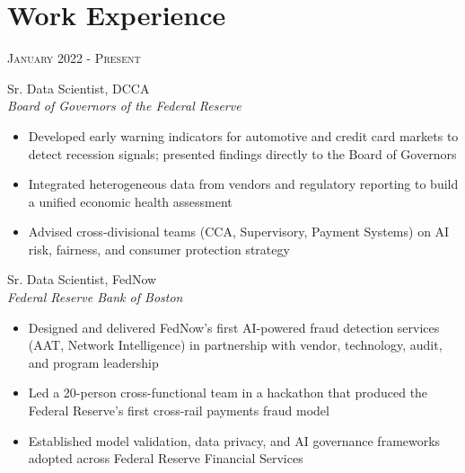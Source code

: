 \documentclass[9pt]{article} %
\begin{document}
\begin{minipage}[t]{0.55\textwidth} %
\vspace{0pt} %
	

\section{Work Experience} 

{\raggedleft\textsc{January 2022 - Present}\par}

{\raggedright\large Sr. Data Scientist,  DCCA\\ 
\textit{Board of Governors of the Federal Reserve}\\[1pt]}

\normalsize{
\begin{itemize}
\item Developed early warning indicators for automotive and credit card markets to detect recession signals; presented findings directly to the Board of Governors
\item Integrated heterogeneous data from vendors and regulatory reporting to build a unified economic health assessment
\item Advised cross-divisional teams (CCA, Supervisory, Payment Systems) on AI risk, fairness, and consumer protection strategy
\end{itemize}}

{\raggedright\large Sr. Data Scientist,  FedNow\\ 
\textit{Federal Reserve Bank of Boston}\\[1pt]}

\normalsize{
\begin{itemize}
\item Designed and delivered FedNow's first AI-powered fraud detection services (AAT, Network Intelligence) in partnership with vendor, technology, audit, and program leadership
\item Led a 20-person cross-functional team in a hackathon that produced the Federal Reserve's first cross-rail payments fraud model
\item Established model validation, data privacy, and AI governance frameworks adopted across Federal Reserve Financial Services
\end{itemize}}


\end{minipage}
\end{document}
